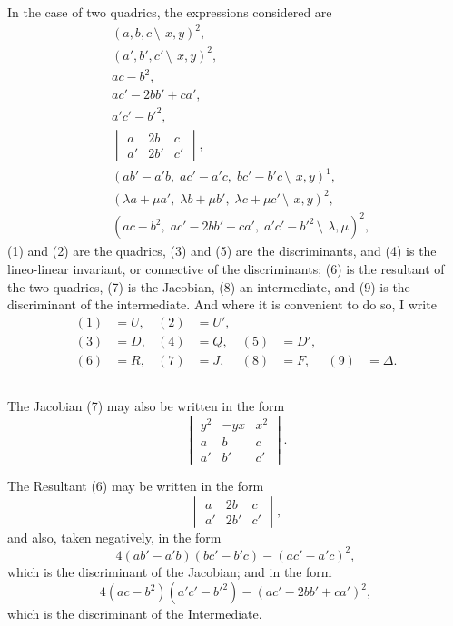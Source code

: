 \documentclass[11pt,a4paper]{book}
\begin{document}
\begin{center}
In the case of two quadrics, the expressions considered are
\begin{align}
&(a, b, c\,\setminus\!\!\:\, x, y)^2, \tag{1}\\
&(a', b', c'\,\setminus\!\!\:\, x, y)^2, \tag{2}\\
&ac - b^2, \tag{3}\\
&ac' - 2bb' + ca', \tag{4}\\
&a'c' - b'^2, \tag{5}\\
&\begin{vmatrix}
a & 2b & c \\
a' & 2b' & c'
\end{vmatrix}, \tag{6}\\
&(ab' - a'b,\; ac' - a'c,\; bc' - b'c\,\setminus\!\!\:\, x, y)^1, \tag{7}\\
&(\lambda a + \mu a',\; \lambda b + \mu b',\; \lambda c + \mu c'\,\setminus\!\!\:\, x, y)^2, \tag{8}\\
&(ac - b^2,\; ac' - 2bb' + ca',\; a'c' - b'^2\,\setminus\!\!\:\, \lambda, \mu)^2, \tag{9}
\end{align}
(1) and (2) are the quadrics, (3) and (5) are the discriminants, and (4) is the lineo-linear invariant, or connective of the discriminants; (6) is the resultant of the two quadrics, (7) is the Jacobian, (8) an intermediate, and (9) is the discriminant of the intermediate. And where it is convenient to do so, I write
\begin{align*}
(1) &= U, & (2) &= U',\\
(3) &= D, & (4) &= Q, & (5) &= D',\\
(6) &= R, & (7) &= J, & (8) &= F, & (9) &= \Delta.
\end{align*}

\subsection{}

The Jacobian (7) may also be written in the form
\[
\begin{vmatrix}
y^2 & -yx & x^2 \\
a & b & c \\
a' & b' & c'
\end{vmatrix}.
\]

The Resultant (6) may be written in the form
\[
\begin{vmatrix}
a & 2b & c \\
a' & 2b' & c'
\end{vmatrix},
\]
and also, taken negatively, in the form
\[
4(ab' - a'b)(bc' - b'c) - (ac' - a'c)^2,
\]
which is the discriminant of the Jacobian; and in the form
\[
4(ac - b^2)(a'c' - b'^2) - (ac' - 2bb' + ca')^2,
\]
which is the discriminant of the Intermediate.


\end{center}
\end{document}
